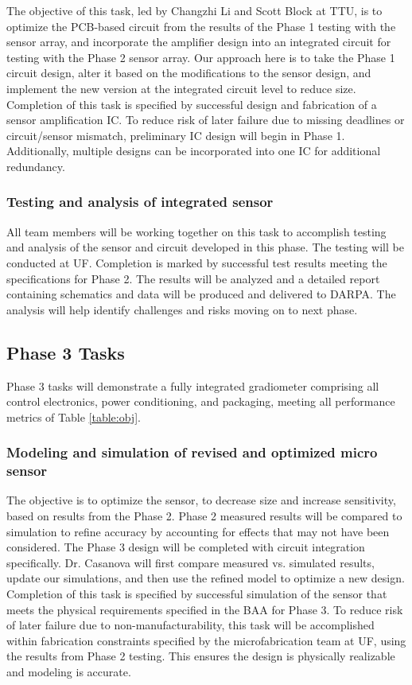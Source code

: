 The objective of this task, led by Changzhi Li and Scott Block at TTU, is to optimize the PCB-based circuit from the results of the Phase 1 testing with the sensor array, and incorporate the amplifier design into an integrated circuit for testing with the Phase 2 sensor array. Our approach here is to take the Phase 1 circuit design, alter it based on the modifications to the sensor design, and implement the new version at the integrated circuit level to reduce size. Completion of this task is specified by successful design and fabrication of a sensor amplification IC. To reduce risk of later failure due to missing deadlines or circuit/sensor mismatch, preliminary IC design will begin in Phase 1. Additionally, multiple designs can be incorporated into one IC for additional redundancy.


\subsubsection{Testing and analysis of integrated sensor}\label{sec:p2:test}

All team members will be working together on this task to accomplish testing and analysis of the sensor and circuit developed in this phase. The testing will be conducted at UF. Completion is marked by successful test results meeting the specifications for Phase 2. The results will be analyzed and a detailed report containing schematics and data will be produced and delivered to DARPA. The analysis will help identify challenges and risks moving on to next phase.

\subsection{Phase 3 Tasks}
Phase 3 tasks will demonstrate a fully integrated gradiometer comprising all control
electronics, power conditioning, and packaging, meeting all performance metrics of Table  \ref{table:obj}.

\subsubsection{Modeling and simulation of revised and optimized micro sensor}\label{sec:p3:em}

The objective is to optimize the sensor, to decrease size and increase sensitivity, based on results from the Phase 2. Phase 2 measured results will be compared to simulation to refine accuracy by accounting for effects that may not have been considered. The Phase 3 design will be completed with circuit integration specifically. Dr. Casanova will first compare measured vs. simulated results, update our simulations, and then use the refined model to optimize a new design. Completion of this task is specified by successful simulation of the sensor that meets the physical requirements specified in the BAA for Phase 3. To reduce risk of later failure due to non-manufacturability, this task will be accomplished within fabrication constraints specified by the microfabrication team at UF, using the results from Phase 2 testing. This ensures the design is physically realizable and modeling is accurate.

